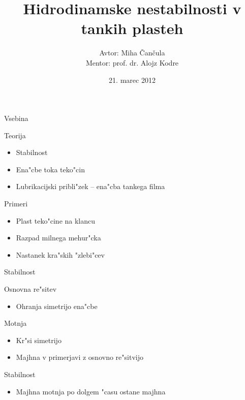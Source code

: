 \documentclass{beamer}
\date{21. marec 2012}
\title{Hidrodinamske nestabilnosti v tankih plasteh}
\author{Avtor: Miha \v Can\v cula \\ Mentor: prof. dr. Alojz Kodre}
\begin{document}
\frame{\titlepage}

\begin{frame}{Vsebina}
\begin{block}{Teorija}
 \begin{itemize}
  \item Stabilnost
  \item Ena"cbe toka teko"cin
  \item Lubrikacijski pribli"zek -- ena"cba tankega filma
  \end{itemize}
\end{block}
\begin{block}{Primeri}
  \begin{itemize}
    \item{Plast teko"cine na klancu}
    \item{Razpad milnega mehur"cka}
    \item{Nastanek kra"skih "zlebi"cev}
  \end{itemize}
\end{block}
\end{frame}


\begin{frame}{Stabilnost}
\begin{block}{Osnovna re"sitev}
 \begin{itemize}
  \item Ohranja simetrijo ena"cbe
 \end{itemize}
\end{block}

\begin{block}{Motnja}
 \begin{itemize}
 \item Kr"si simetrijo
 \item Majhna v primerjavi z osnovno re"sitvijo
 \end{itemize}
 \end{block}
 
 \begin{block}{Stabilnost}
 \begin{itemize}
  \item Majhna motnja po dolgem "casu ostane majhna
 \end{itemize}
 \end{block}

\end{frame}
\end{document}
